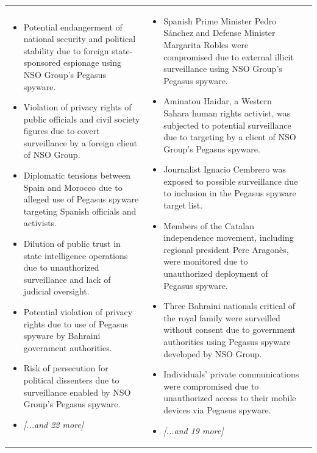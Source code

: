 \begin{longtable}{p{5.2cm}|p{5.2cm}|p{5.2cm}}
\begin{itemize}[leftmargin=*, nosep, before=\vspace{-0.5\baselineskip}, after=\vspace{-0.5\baselineskip}]
\footnotesize
\item Potential endangerment of national security and political stability due to foreign state-sponsored espionage using NSO Group's Pegasus spyware.
\item Violation of privacy rights of public officials and civil society figures due to covert surveillance by a foreign client of NSO Group.
\item Diplomatic tensions between Spain and Morocco due to alleged use of Pegasus spyware targeting Spanish officials and activists.
\item Dilution of public trust in state intelligence operations due to unauthorized surveillance and lack of judicial oversight.
\item Potential violation of privacy rights due to use of Pegasus spyware by Bahraini government authorities.
\item Risk of persecution for political dissenters due to surveillance enabled by NSO Group's Pegasus spyware.
\item \textit{[...and 22 more]}
\end{itemize} & \begin{itemize}[leftmargin=*, nosep, before=\vspace{-0.5\baselineskip}, after=\vspace{-0.5\baselineskip}] 
\footnotesize
\item Spanish Prime Minister Pedro Sánchez and Defense Minister Margarita Robles were compromised due to external illicit surveillance using NSO Group's Pegasus spyware.
\item Aminatou Haidar, a Western Sahara human rights activist, was subjected to potential surveillance due to targeting by a client of NSO Group’s Pegasus spyware.
\item Journalist Ignacio Cembrero was exposed to possible surveillance due to inclusion in the Pegasus spyware target list.
\item Members of the Catalan independence movement, including regional president Pere Aragonès, were monitored due to unauthorized deployment of Pegasus spyware.
\item Three Bahraini nationals critical of the royal family were surveilled without consent due to government authorities using Pegasus spyware developed by NSO Group.
\item Individuals' private communications were compromised due to unauthorized access to their mobile devices via Pegasus spyware.
\item \textit{[...and 19 more]}

\end{itemize}
\end{longtable}
